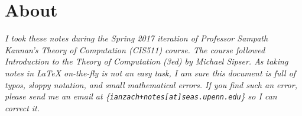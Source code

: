 




	
	
\vspace*{\fill}
\section*{About}
\textsl{{\Large I took these notes during the Spring 2017 iteration of Professor Sampath Kannan's Theory of Computation (CIS511) course.  The course followed \textit{Introduction to the Theory of Computation (3ed)} by Michael Sipser. As taking notes in \LaTeX\xspace on-the-fly is not an easy task, I am sure this document is full of typos, sloppy notation, and small mathematical errors.  If you find such an error, please send me an email at \{\texttt{ianzach+notes[at]seas.upenn.edu}\} so I can correct it.\\}}


\vspace*{1 in}
 
 \pagebreak





\pagebreak
\pagebreak
\pagebreak
\pagebreak
\pagebreak
\pagebreak
\pagebreak
\pagebreak
\pagebreak
\pagebreak
\pagebreak
\pagebreak
\pagebreak
\pagebreak
\pagebreak
\pagebreak
\pagebreak
\pagebreak
\pagebreak
\pagebreak
\pagebreak
\pagebreak
\pagebreak
\pagebreak	
\pagebreak
\pagebreak



	
